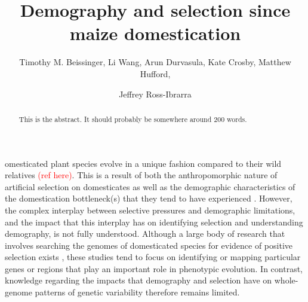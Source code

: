 \documentclass{pnastwo}
\begin{document}
\title{Demography and selection since maize domestication}
\author{Timothy M. Beissinger, Li Wang, Arun
  Durvasula, Kate Crosby, Matthew Hufford, \and Jeffrey
  Ross-Ibrarra }


\maketitle

\begin{article}

\begin{abstract}
This is the abstract. It should probably be somewhere around 200 words.
\end{abstract}

omesticated plant species evolve in a unique fashion
compared to their wild relatives \textcolor{red}{(ref here)}. This
is a result of both the anthropomorphic nature of artificial selection on
domesticates \cite{purugganan2009} as well as the demographic characteristics of the domestication
bottleneck(s) that they tend to have experienced
\cite{ross2007}. However, the
complex interplay between selective pressures and demographic
limitations, and the impact that this interplay has on identifying
selection and understanding demography, is not fully understood. Although a large body of
research that involves searching the genomes of domesticated species for evidence
of positive selection exists \cite{hufford2012, he2011, OTHERS?}, these studies tend to focus on
identifying or mapping particular genes or regions that play an
important role in phenotypic evolution. In contrast, knowledge regarding the impacts that demography and
selection have on whole-genome patterns of genetic variability therefore remains limited.


\end{article}
\end{document}

